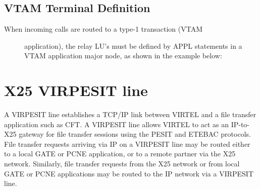 \documentclass[letterpaper,10pt,english]{sphinxmanual}
\begin{document}

\subsection{VTAM Terminal Definition}
\label{\detokenize{connectivity_guide:vtam-terminal-definition}}\label{\detokenize{connectivity_guide:index-54}}\begin{description}
\item[{When incoming calls are routed to a type-1 transaction (VTAM}] \leavevmode
application), the relay LU’s must be defined by APPL statements in a
VTAM application major node, as shown in the example below:

\end{description}

\begin{sphinxVerbatim}[commandchars=\\\{\}]
  
  
  
  
\end{sphinxVerbatim}

\newpage


\section{X25 VIRPESIT line}
\label{\detokenize{connectivity_guide:x25-virpesit-line}}\label{\detokenize{connectivity_guide:index-55}}
A VIRPESIT line establishes a TCP/IP link between VIRTEL and a file transfer application such as CFT. A VIRPESIT line allows VIRTEL to act as an IP-to-X25 gateway for file transfer sessions using the PESIT and ETEBAC protocols. File transfer requests arriving via IP on a VIRPESIT line may be routed either to a local GATE or PCNE application, or to a remote partner via the X25 network. Similarly, file transfer requests from the X25 network or from local GATE or PCNE applications may be routed to the IP network via a VIRPESIT line.
\end{document}
